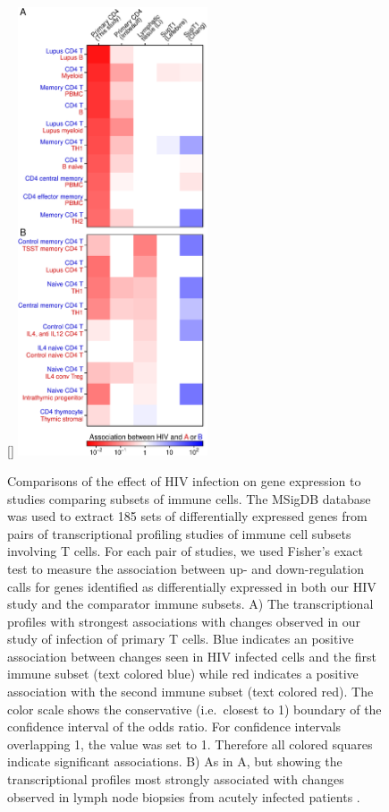 \documentclass[../sherrill-Mix_thesis.tex]{subfiles}
\begin{document}
		\begin{figure}
			\centering
			[\FBwidth]{
				\includegraphics[width=0.5\textwidth]{compareMsig.pdf}
			}{
				\caption[Comparisons of the effect of HIV infection on gene expression to studies comparing subsets of immune cells]{Comparisons of the effect of HIV infection on gene expression to studies comparing subsets of immune cells. The MSigDB database was used to extract 185 sets of differentially expressed genes from pairs of transcriptional profiling studies of immune cell subsets involving \cdFour{} T cells. For each pair of studies, we used Fisher's exact test to measure the association between up- and down-regulation calls for genes identified as differentially expressed in both our HIV study and the comparator immune subsets. A) The transcriptional profiles with strongest associations with changes observed in our study of \hivEight{} infection of primary T cells. Blue indicates an positive association between changes seen in HIV infected cells and the first immune subset (text colored blue) while red indicates a positive association with the second immune subset (text colored red). The color scale shows the conservative (i.e.\  closest to 1) boundary of the confidence interval of the odds ratio. For confidence intervals overlapping 1, the value was set to 1. Therefore all colored squares indicate significant associations. B) As in A, but showing the transcriptional profiles most strongly associated with changes observed in lymph node biopsies from acutely infected patients \citep{Li2009}. }
				\label{figMsig}
			}
		\end{figure}
\end{document}
